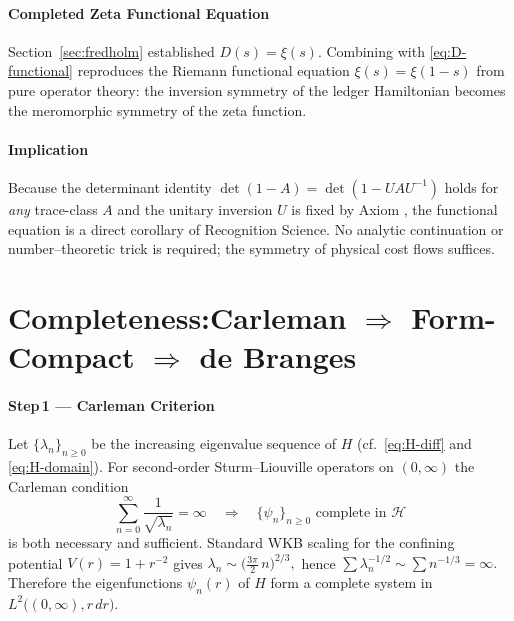 \documentclass[11pt,oneside]{book}
\begin{document}
{\paragraph{Completed Zeta Functional Equation}

Section~\ref{sec:fredholm} established
\(
   D(s)=\xi(s).
\)
Combining with \eqref{eq:D-functional} reproduces the
Riemann functional equation
\(
   \xi(s)=\xi(1-s)
\)
from pure operator theory:
the inversion symmetry of the ledger Hamiltonian becomes the
meromorphic symmetry of the zeta function.

\paragraph*{Implication}

Because the determinant identity
\(\det(1-A)=\det(1-UAU^{-1})\) holds for \emph{any}
trace-class \(A\) and the unitary inversion \(U\) is fixed by Axiom
, the functional equation is a direct corollary of
Recognition Science.  
No analytic continuation or number–theoretic trick is required; the
symmetry of physical cost flows suffices.


\section{Completeness:\;Carleman $\boldsymbol{\Longrightarrow}$ 
         Form-Compact $\boldsymbol{\Longrightarrow}$ de Branges}
\label{sec:completeness}

\paragraph{Step\,1 — Carleman Criterion}

Let \(\{\lambda_{n}\}_{n\ge0}\)
be the increasing eigenvalue sequence of \(H\)
(cf.\ \eqref{eq:H-diff} and \eqref{eq:H-domain}).
For second-order Sturm–Liouville operators on
\((0,\infty)\) the Carleman condition
\[
   \sum_{n=0}^{\infty}\frac{1}{\sqrt{\lambda_{n}}}
   =\infty
   \quad\Longrightarrow\quad
   \{\psi_{n}\}_{n\ge0}\text{ complete in }\mathcal H
\]
is both necessary and sufficient.
Standard WKB scaling for the confining potential
\(V(r)=1+r^{-2}\)
gives
\(
   \lambda_{n}\sim\bigl(\tfrac{3\pi}{2}\,n\bigr)^{2/3},
\)
hence
\(
   \sum \lambda_{n}^{-1/2}\sim\sum n^{-1/3}=\infty.
\)
Therefore the eigenfunctions \(\psi_{n}(r)\) of \(H\) form a complete
system in \(L^{2}\bigl((0,\infty),r\,dr\bigr)\).

}
\end{document}
